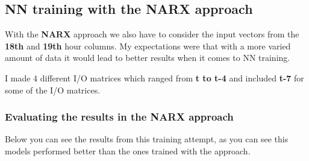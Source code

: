 \documentclass[11pt]{article}
\begin{document}
\subsection{NN training with the NARX approach}
With the \textbf{NARX} approach we also have to consider the input vectors from the \textbf{18th} and \textbf{19th} hour columns. My expectations were that with a more varied amount of data
it would lead to better results when it comes to NN training.

I made 4 different I/O matrices which ranged from \textbf{t to t-4} and included \textbf{t-7} for some of the I/O matrices.

\subsubsection{Evaluating the results in the NARX approach}
Below you can see the results from this training attempt, as you can see this models performed better than the ones trained with the  approach.
\end{document}
